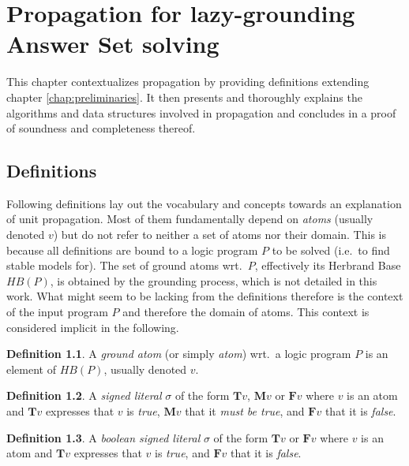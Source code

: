 \documentclass{vutinfth} %
\theoremstyle{example}
\theoremstyle{definition}
\newtheorem{definition}{Definition}[section]
\theoremstyle{theorem}
\theoremstyle{lemma}
\theoremstyle{corollary}
\begin{document}
\chapter{Propagation for lazy-grounding Answer Set solving}

This chapter contextualizes propagation by providing definitions extending chapter \ref{chap:preliminaries}. It then presents and thoroughly explains the algorithms and data structures involved in propagation and concludes in a proof of soundness and completeness thereof.

\section{Definitions}


Following definitions lay out the vocabulary and concepts towards an explanation of unit propagation. Most of them fundamentally depend on \emph{atoms} (usually denoted $v$) but do not refer to neither a set of atoms nor their domain. This is because all definitions are bound to a logic program $P$ to be solved (i.e.~to find stable models for). The set of ground atoms wrt.~$P$, effectively its Herbrand Base $\textit{HB}(P)$, is obtained by the grounding process, which is not detailed in this work. What might seem to be lacking from the definitions therefore is the context of the input program $P$ and therefore the domain of atoms. This context is considered implicit in the following.

\begin{definition}
A \emph{ground atom} (or simply \emph{atom}) wrt.~a logic program $P$ is an element of $\textit{HB}(P)$, usually denoted $v$.
\end{definition}

\begin{definition}
A \emph{signed literal} $\sigma$ of the form $\mathbf{T}v$, $\mathbf{M}v$ or $\mathbf{F}v$ where $v$ is an atom and $\mathbf{T}v$ expresses that $v$ is \emph{true}, $\mathbf{M}v$ that it \emph{must be true}, and $\mathbf{F}v$ that it is \emph{false}.
\end{definition}

\begin{definition}
A \emph{boolean signed literal} $\sigma$ of the form $\mathbf{T}v$ or $\mathbf{F}v$ where $v$ is an atom and  $\mathbf{T}v$ expresses that $v$ is \emph{true}, and $\mathbf{F}v$ that it is \emph{false}.
\end{definition}
\end{document}

